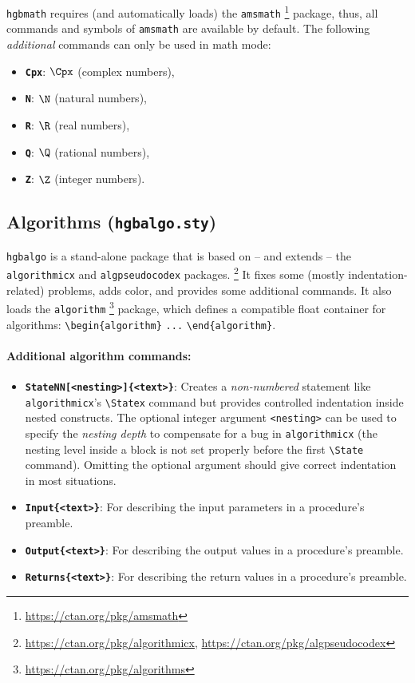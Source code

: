 \documentclass[language=english]{hgbarticle}
\begin{document}
\texttt{hgbmath} requires (and automatically loads) the \texttt{amsmath}%
\footnote{\url{https://ctan.org/pkg/amsmath}}
package, thus, all commands and symbols of \texttt{amsmath} are available by
default. The following \emph{additional} commands can only be used in math mode:
%
\begin{itemize}
    \item \textbf{\texttt{{\bs}Cpx}}: $\Cpx$ (complex numbers),
    \item \textbf{\texttt{{\bs}N}}: $\N$ (natural numbers),
    \item \textbf{\texttt{{\bs}R}}: $\R$ (real numbers),
    \item \textbf{\texttt{{\bs}Q}}: $\Q$ (rational numbers),
    \item \textbf{\texttt{{\bs}Z}}: $\Z$ (integer numbers).
\end{itemize}


\subsection{Algorithms (\texttt{hgbalgo.sty})}

\texttt{hgbalgo} is a stand-alone package that is based on -- and extends --
the \texttt{algorithmicx} and \texttt{algpseudocodex} packages.%
\footnote{\url{https://ctan.org/pkg/algorithmicx},
    \url{https://ctan.org/pkg/algpseudocodex}}
It fixes some (mostly indentation-related) problems, adds color, and provides
some additional commands. It also loads the \texttt{algorithm}%
\footnote{\url{https://ctan.org/pkg/algorithms}}
package, which defines a compatible float container for algorithms:
\verb!\begin{algorithm}! \verb!...! \verb!\end{algorithm}!.

\paragraph{Additional algorithm commands:}
\begin{itemize}
    \item
    \textbf{\texttt{{\bs}StateNN[<nesting>]\{<text>\}}}:
    Creates a \emph{non-numbered} statement like \texttt{algo\-rith\-micx}'s
    \verb!\Statex! command but provides controlled indentation inside nested
    constructs. The optional integer argument \verb!<nesting>! can be used to
    specify the \emph{nesting depth} to compensate for a bug in
    \texttt{algorithmicx} (the nesting level inside a block is not set
    properly before the first \verb!\State! command). Omitting the optional
    argument should give correct indentation in most situations.
    \item
    \textbf{\texttt{{\bs}Input\{<text>\}}}:
    For describing the input parameters in a procedure's preamble.
    \item
    \textbf{\texttt{{\bs}Output\{<text>\}}}:
    For describing the output values in a procedure's preamble.
    \item
    \textbf{\texttt{{\bs}Returns\{<text>\}}}:
    For describing the return values in a procedure's preamble.
\end{itemize}
\end{document}
